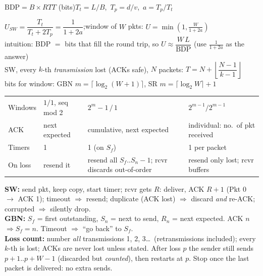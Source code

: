 \begin{multicols*}{3}
\begin{formulabox}
$\text{BDP}=B\times RTT$ (bits)\quad $T_t=L/B$,\ $T_p=d/v$,\ $a=T_p/T_t$\\[2pt]
\raggedright
$U_{SW}=\dfrac{T_t}{T_t+2T_p}=\dfrac{1}{1+2a}$;\quad window of $W$ pkts: $U=\min\!\left(1,\frac{W}{1+2a}\right)$\\[2pt]
intuition: BDP $=$ bits that fill the round trip, so $U\approx \dfrac{W\,L}{\text{BDP}}$ (use $\frac{1}{1+2a}$ as the answer)\\[2pt]
SW, every $k$-th \emph{transmission} lost (ACKs safe), $N$ packets: $T=N+\left\lfloor\dfrac{N-1}{k-1}\right\rfloor$\\[2pt]
bits for window: GBN $m=\lceil\log_2(W+1)\rceil$, SR $m=\lceil\log_2 W\rceil+1$
\end{formulabox}

\noindent\begin{minipage}{\linewidth}
 
\begin{center}\scriptsize\zebra
\begin{tabularx}{\linewidth}{@{}L{11mm}YYY@{}}\toprule
 &  &  & \\\midrule
Windows & $1/1$, seq mod 2 & $2^m-1\,/\,1$ & $2^{m-1}/2^{m-1}$\\
ACK & next expected & cumulative, next expected & individual: no.\ of pkt received\\
Timers & 1 & 1 (on $S_f$) & 1 per packet\\
On loss & resend it & resend all $S_f..S_n{-}1$; rcvr discards out-of-order & resend only lost; rcvr buffers\\\bottomrule
\end{tabularx}
\end{center}
\end{minipage}\par
\textbf{SW:} send pkt, keep copy, start timer; rcvr gets $R$: deliver, ACK $R{+}1$ (Pkt 0 $\to$ ACK 1); timeout $\Rightarrow$ resend; duplicate (ACK lost) $\Rightarrow$ discard \emph{and} re-ACK; corrupted $\Rightarrow$ silently drop.\\
\textbf{GBN:} $S_f$ = first outstanding, $S_n$ = next to send, $R_n$ = next expected. ACK $n$ $\Rightarrow S_f=n$. Timeout $\Rightarrow$ ``go back'' to $S_f$.\\
\textbf{Loss count:} number \emph{all} transmissions 1, 2, 3\dots\ (retransmissions included); every $k$-th is lost; ACKs are never lost unless stated. After loss $p$ the sender still sends $p{+}1..p{+}W{-}1$ (discarded but \emph{counted}), then restarts at $p$. Stop once the last packet is delivered: no extra sends.


\end{multicols*}
